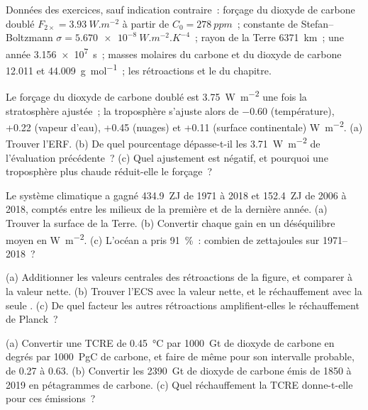Données des exercices, sauf indication contraire~: forçage du dioxyde de carbone doublé $F_{2\times} =
\qty{3.93}{W.m^{-2}}$ à partir de $C_0 = \qty{278}{ppm}$~; constante de Stefan--Boltzmann $\sigma =
\qty{5.670e-8}{W.m^{-2}.K^{-4}}$~; rayon de la Terre \qty{6371}{km}~; une année \qty{3.156e7}{s}~;
masses molaires du carbone et du dioxyde de carbone 12.011 et \qty{44.009}{g.mol^{-1}}~; les
rétroactions et le  du chapitre.

\begin{exercise}[$\star$]\label{exo:b2:anthropogenic-climate-change:1}
Le forçage du dioxyde de carbone doublé est \qty{3.75}{W.m^{-2}} une fois la stratosphère
ajustée~; la troposphère s'ajuste alors de $-0.60$ (température), +0.22 (vapeur d'eau),
+0.45 (nuages) et +0.11 (surface continentale) \unit{W.m^{-2}}. (a) Trouver l'ERF. (b) De
quel pourcentage dépasse-t-il les \qty{3.71}{W.m^{-2}} de l'évaluation précédente~? (c) Quel
ajustement est négatif, et pourquoi une troposphère plus chaude réduit-elle le forçage~?
\end{exercise}

\begin{exercise}[$\star$]\label{exo:b2:anthropogenic-climate-change:2}
Le système climatique a gagné \qty{434.9}{ZJ} de 1971 à 2018 et \qty{152.4}{ZJ} de 2006 à
2018, comptés entre les milieux de la première et de la dernière année. (a) Trouver la
surface de la Terre. (b) Convertir chaque gain en un déséquilibre moyen en \unit{W.m^{-2}}.
(c) L'océan a pris \qty{91}{\percent}~: combien de zettajoules sur 1971--2018~?
\end{exercise}

\begin{exercise}[$\star$]\label{exo:b2:anthropogenic-climate-change:3}
(a) Additionner les valeurs centrales des rétroactions de la figure, et comparer à la valeur
nette. (b) Trouver l'ECS avec la valeur nette, et le réchauffement avec la seule . (c) De quel facteur les autres rétroactions amplifient-elles le réchauffement de Planck~?
\end{exercise}

\begin{exercise}[$\star$]\label{exo:b2:anthropogenic-climate-change:4}
(a) Convertir une TCRE de \qty{0.45}{\celsius} par \qty{1000}{Gt} de dioxyde de carbone en
degrés par \qty{1000}{PgC} de carbone, et faire de même pour son intervalle probable, de
0.27 à 0.63. (b) Convertir les \qty{2390}{Gt} de dioxyde de carbone émis de 1850 à 2019 en
pétagrammes de carbone. (c) Quel réchauffement la TCRE donne-t-elle pour ces émissions~?
\end{exercise}


